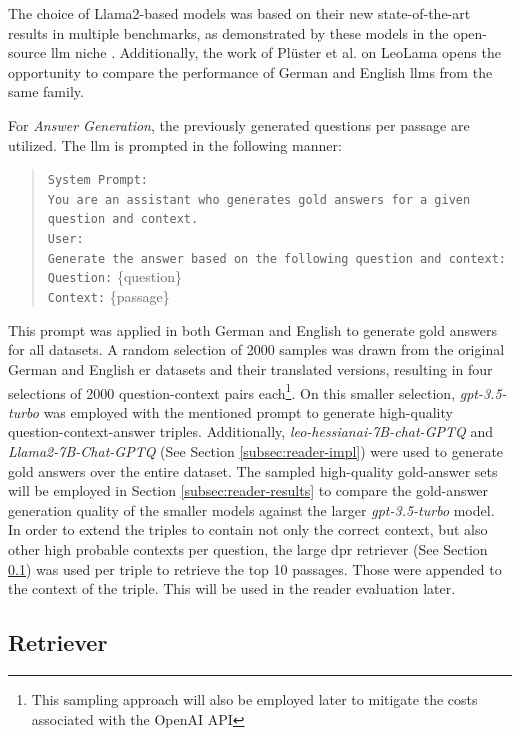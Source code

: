 The choice of Llama2-based models was based on their new state-of-the-art results in multiple benchmarks, as demonstrated by these models in the open-source \gls{llm} niche \cite{touvron_llama_2023}. Additionally, the work of Plüster et al. \cite{pluster_leolm_2023} on LeoLama opens the opportunity to compare the performance of German and English \gls{llm}s from the same family.

For \textit{Answer Generation}, the previously generated questions per passage are utilized. The \gls{llm} is prompted in the following manner:

\begin{quote}
    \texttt{System Prompt:}\\
    \texttt{You are an assistant who generates gold answers for a given question and context.}\\
    \texttt{User:}\\
    \texttt{Generate the answer based on the following question and context:}\\
    \texttt{Question:} \{question\} \\
    \texttt{Context:} \{passage\}
\end{quote}

This prompt was applied in both German and English to generate gold answers for all datasets. A random selection of 2000 samples was drawn from the original German and English \gls{er} datasets and their translated versions, resulting in four selections of 2000 question-context pairs each\footnote{This sampling approach will also be employed later to mitigate the costs associated with the OpenAI API}. On this smaller selection, \textit{gpt-3.5-turbo} was employed with the mentioned prompt to generate high-quality question-context-answer triples. Additionally, \textit{leo-hessianai-7B-chat-GPTQ} and \textit{Llama2-7B-Chat-GPTQ} (See Section \ref{subsec:reader-impl}) were used to generate gold answers over the entire dataset. The sampled high-quality gold-answer sets will be employed in Section \ref{subsec:reader-results} to compare the gold-answer generation quality of the smaller models against the larger \textit{gpt-3.5-turbo} model. In order to extend the triples to contain not only the correct context, but also other high probable contexts per question, the large \gls{dpr} retriever (See Section \ref{subsec:retriever-impl}) was used per triple to retrieve the top 10 passages. Those were appended to the context of the triple. This will be used in the reader evaluation later.

\subsection{Retriever}
\label{subsec:retriever-impl}


